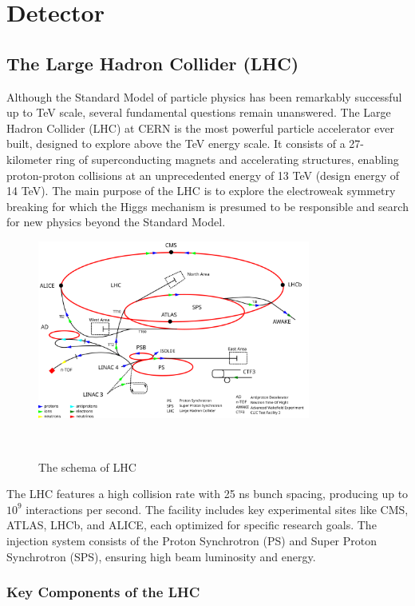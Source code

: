 \chapter{Detector}

\section{The Large Hadron Collider (LHC)}
Although the Standard Model of particle physics has been remarkably successful up to TeV scale, several fundamental questions remain unanswered. The Large Hadron Collider (LHC) at CERN is the most powerful particle accelerator ever built, designed to explore above the TeV energy scale. It consists of a 27-kilometer ring of superconducting magnets and accelerating structures, enabling proton-proton collisions at an unprecedented energy of 13 TeV (design energy of 14 TeV). The main purpose of the LHC is to explore the electroweak symmetry breaking for which the Higgs mechanism is presumed to be responsible and search for new physics beyond the Standard Model.
\begin{figure}[ht]
    \centering
    \includegraphics[width=0.8\textwidth]{Figures/Cern_Accelerator_Complex.png} %
    \caption{The schema of LHC} ~\cite{lhc_picture}
    \label{fig:lhc}
\end{figure}

The LHC features a high collision rate with 25 ns bunch spacing, producing up to $10^9$ interactions per second. The facility includes key experimental sites like CMS, ATLAS, LHCb, and ALICE, each optimized for specific research goals. The injection system consists of the Proton Synchrotron (PS) and Super Proton Synchrotron (SPS), ensuring high beam luminosity and energy.

\subsection{Key Components of the LHC}

